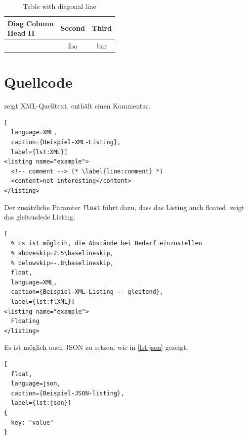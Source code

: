 \documentclass[
  fontsize=10pt,
  numbers=noenddot,
  english,  %
  paper=a5,
  twoside,  %
  DIV=calc,
  headings=small,
  bibliography=totoc,
  listof=totoc,
  draft=false
]{scrbook}
\theoremstyle{break}
\begin{document}
\begin{ltgexample}
\begin{table}
  \caption{Table with diagonal line}
  \label{tab:diag}
  \begin{center}
    \begin{tabular}{|l|c|c|}
      \hline
      \diagbox[width=10em]{Diag \\Column Head I}{Diag Column\\Head II} & Second & Third \\
      \hline
       & foo & bar              \\
      \hline
    \end{tabular}
  \end{center}
\end{table}
\end{ltgexample}


\section{Quellcode}

\begin{ltgexample}
 zeigt XML-Quelltext.
 enthält einen Kommentar.

\begin{lstlisting}[
  language=XML,
  caption={Beispiel-XML-Listing},
  label={lst:XML}]
<listing name="example">
  <!-- comment --> (* \label{line:comment} *)
  <content>not interesting</content>
</listing>
\end{lstlisting}
\end{ltgexample}

Der zusätzliche Paramter \verb+float+ führt dazu, dass das Listing auch floated.
 zeigt das gleitendede Listing.

\begin{ltgexample}
\begin{lstlisting}[
  % Es ist möglcih, die Abstände bei Bedarf einzustellen
  % aboveskip=2.5\baselineskip,
  % belowskip=-.8\baselineskip,
  float,
  language=XML,
  caption={Beispiel-XML-Listing -- gleitend},
  label={lst:flXML}]
<listing name="example">
  Floating
</listing>
\end{lstlisting}
\end{ltgexample}

Es ist möglich auch JSON zu setzen, wie in \cref{lst:json} gezeigt.

\begin{ltgexample}
\begin{lstlisting}[
  float,
  language=json,
  caption={Beispiel-JSON-listing},
  label={lst:json}]
{
  key: "value"
}
\end{lstlisting}
\end{ltgexample}
\end{document}
